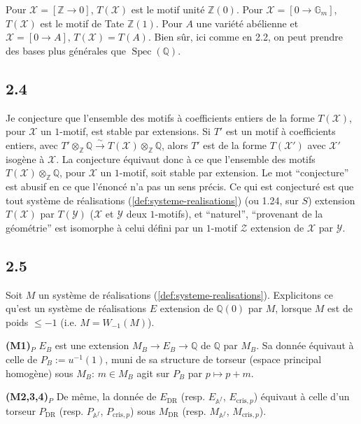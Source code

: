 \documentclass[12pt,a4paper]{article}
\theoremstyle{plain}
\theoremstyle{definition}
\theoremstyle{remark}
\DeclareMathOperator{\Spec}{Spec}
\providecommand{\Spec}{\operatorname{Spec}}
\providecommand{\DR}{\mathrm{DR}}
\providecommand{\cris}{\mathrm{cris}}
\begin{document}
Pour $\mathcal{X} = [\mathbb{Z} \to 0]$, $T(\mathcal{X})$ est le motif unit\'e
$\mathbb{Z}(0)$. Pour $\mathcal{X} = [0 \to \mathbb{G}_m]$,
$T(\mathcal{X})$ est le motif de Tate $\mathbb{Z}(1)$. Pour $A$ une vari\'et\'e
ab\'elienne et $\mathcal{X} = [0 \to A]$, $T(\mathcal{X}) = T(A)$. Bien s\^ur, ici comme
en 2.2, on peut prendre des bases plus g\'en\'erales que $\Spec(\mathbb{Q})$.

\subsection*{2.4}

Je conjecture que l'ensemble des motifs \`a coefficients entiers de la forme
$T(\mathcal{X})$, pour $\mathcal{X}$ un $1$-motif, est stable par extensions. Si $T'$ est
un motif \`a coefficients entiers, avec $T' \otimes_{\mathbb{Z}} \mathbb{Q} \xrightarrow{\sim}
T(\mathcal{X}) \otimes_{\mathbb{Z}} \mathbb{Q}$, alors $T'$ est de la forme $T(\mathcal{X}')$
avec $\mathcal{X}'$ isog\`ene \`a $\mathcal{X}$. La conjecture \'equivaut donc \`a ce que
l'ensemble des motifs $T(\mathcal{X}) \otimes_{\mathbb{Z}} \mathbb{Q}$, pour $\mathcal{X}$ un
$1$-motif, soit stable par extension. Le mot ``conjecture'' est abusif en ce que
l'\'enonc\'e n'a pas un sens pr\'ecis. Ce qui est conjectur\'e est que tout syst\`eme de
r\'ealisations (\ref{def:systeme-realisations}) (ou 1.24, sur $S$) extension
$T(\mathcal{X})$ par $T(\mathcal{Y})$ ($\mathcal{X}$ et $\mathcal{Y}$ deux $1$-motifs), et
``naturel'', ``provenant de la g\'eom\'etrie'' est isomorphe \`a celui d\'efini par un
$1$-motif $\mathcal{Z}$ extension de $\mathcal{X}$ par $\mathcal{Y}$.

\subsection*{2.5}

Soit $M$ un syst\`eme de r\'ealisations (\ref{def:systeme-realisations}). Explicitons ce
qu'est un syst\`eme de r\'ealisations $E$ extension de $\mathbb{Q}(0)$ par $M$, lorsque $M$
est de poids $\leq -1$ (i.e. $M = W_{-1}(M)$).

\textbf{(M1)$_P$} $E_B$ est une extension $M_B \to E_B \to \mathbb{Q}$ de $\mathbb{Q}$ par
$M_B$. Sa donn\'ee \'equivaut \`a celle de $P_B := u^{-1}(1)$, muni de sa structure de
torseur (espace principal homog\`ene) sous $M_B$: $m \in M_B$ agit sur $P_B$ par
$p \mapsto p + m$.

\textbf{(M2,3,4)$_P$} De m\^eme, la donn\'ee de $E_{\DR}$ (resp. $E_{\mathbb{A}^f}$,
$E_{\cris,p}$) \'equivaut \`a celle d'un torseur $P_{\DR}$ (resp. $P_{\mathbb{A}^f}$,
$P_{\cris,p}$) sous $M_{\DR}$ (resp. $M_{\mathbb{A}^f}$, $M_{\cris,p}$).
\end{document}
